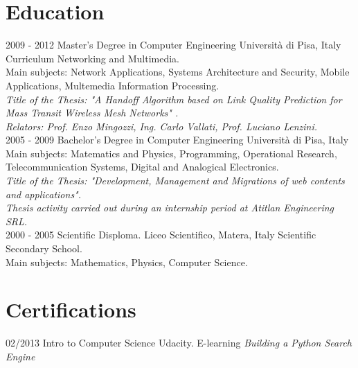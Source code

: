 \documentclass[]{friggeri-cv}
\begin{document}
\section{Education}
\begin{entrylist}
  \entry
    {2009 - 2012}
    {Master's Degree in Computer Engineering}
    {Università di Pisa, Italy}
    {Curriculum Networking and Multimedia.\\
    Main subjects: Network Applications, Systems Architecture and Security, Mobile Applications, Multemedia Information            Processing.\\
    \emph{Title of the Thesis: "A Handoff Algorithm based on Link Quality Prediction for Mass Transit Wireless Mesh Networks"      .}\\
    \emph{Relators: Prof. Enzo Mingozzi, Ing. Carlo Vallati, Prof. Luciano Lenzini.}\\}
  \entry
    {2005 - 2009}
    {Bachelor's Degree in Computer Engineering}
    {Università di Pisa, Italy}
    {Main subjects: Matematics and Physics, Programming, Operational Research, Telecommunication Systems, Digital and Analogical Electronics.\\
    \emph{Title of the Thesis: "Development, Management and Migrations of web contents and applications".}\\
    \emph{Thesis activity carried out during an internship period at Atitlan Engineering SRL.}\\}
  \entry
    {2000 - 2005}
    {Scientific Disploma.}
    {Liceo Scientifico, Matera, Italy}
    {Scientific Secondary School.\\
    Main subjects: Mathematics, Physics, Computer Science.}
\end{entrylist}

\section{Certifications}
\begin{entrylist}
  \entry
    {02/2013}
    {Intro to Computer Science}
    {Udacity. E-learning}
    {\emph{Building a Python Search Engine}}
\end{entrylist}
\end{document}
